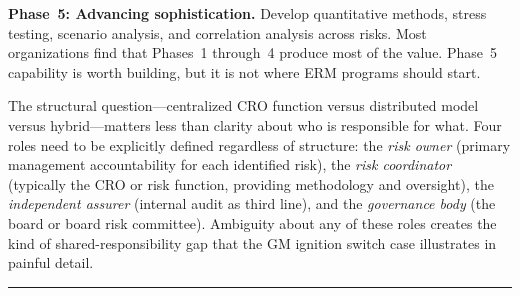 \documentclass[11pt,openany]{book}
\begin{document}
\textbf{Phase~5: Advancing sophistication.} Develop quantitative methods, stress testing, scenario analysis, and correlation analysis across risks. Most organizations find that Phases~1 through~4 produce most of the value. Phase~5 capability is worth building, but it is not where ERM programs should start.

The structural question---centralized CRO function versus distributed model versus hybrid---matters less than clarity about who is responsible for what. Four roles need to be explicitly defined regardless of structure: the \emph{risk owner} (primary management accountability for each identified risk), the \emph{risk coordinator} (typically the CRO or risk function, providing methodology and oversight), the \emph{independent assurer} (internal audit as third line), and the \emph{governance body} (the board or board risk committee). Ambiguity about any of these roles creates the kind of shared-responsibility gap that the GM ignition switch case illustrates in painful detail.

\begin{center}\rule{0.5\linewidth}{0.5pt}\end{center}
\end{document}
